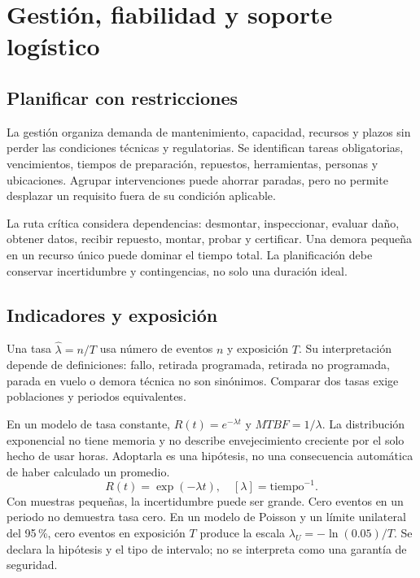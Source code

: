 \chapter{Gestión, fiabilidad y soporte logístico}\label{ch:24}
\section{Planificar con restricciones}
La gestión organiza demanda de mantenimiento, capacidad, recursos y plazos sin perder las condiciones técnicas y regulatorias. Se identifican tareas obligatorias, vencimientos, tiempos de preparación, repuestos, herramientas, personas y ubicaciones. Agrupar intervenciones puede ahorrar paradas, pero no permite desplazar un requisito fuera de su condición aplicable.

La ruta crítica considera dependencias: desmontar, inspeccionar, evaluar daño, obtener datos, recibir repuesto, montar, probar y certificar. Una demora pequeña en un recurso único puede dominar el tiempo total. La planificación debe conservar incertidumbre y contingencias, no solo una duración ideal.
\section{Indicadores y exposición}
Una tasa $\hat\lambda=n/T$ usa número de eventos $n$ y exposición $T$. Su interpretación depende de definiciones: fallo, retirada programada, retirada no programada, parada en vuelo o demora técnica no son sinónimos. Comparar dos tasas exige poblaciones y periodos equivalentes.

En un modelo de tasa constante, $R(t)=e^{-\lambda t}$ y $MTBF=1/\lambda$. La distribución exponencial no tiene memoria y no describe envejecimiento creciente por el solo hecho de usar horas. Adoptarla es una hipótesis, no una consecuencia automática de haber calculado un promedio.
\begin{equation}R(t)=\exp(-\lambda t),\quad [\lambda]=\mathrm{tiempo}^{-1}.\label{eq:fiabilidadexp}\end{equation}
Con muestras pequeñas, la incertidumbre puede ser grande. Cero eventos en un periodo no demuestra tasa cero. En un modelo de Poisson y un límite unilateral del 95\,\%, cero eventos en exposición $T$ produce la escala $\lambda_U=-\ln(0.05)/T$. Se declara la hipótesis y el tipo de intervalo; no se interpreta como una garantía de seguridad.
